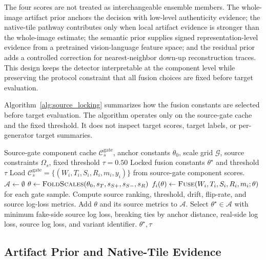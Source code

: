 \documentclass[lettersize,journal]{IEEEtran}
\begin{document}
The four scores are not treated as interchangeable ensemble members. The whole-image artifact prior anchors the decision with low-level authenticity evidence; the native-tile pathway contributes only when local artifact evidence is stronger than the whole-image estimate; the semantic prior supplies signed representation-level evidence from a pretrained vision-language feature space; and the residual prior adds a controlled correction for nearest-neighbor down-up reconstruction traces. This design keeps the detector interpretable at the component level while preserving the protocol constraint that all fusion choices are fixed before target evaluation.

Algorithm~\ref{alg:source_locking} summarizes how the fusion constants are selected before target evaluation. The algorithm operates only on the source-gate cache and the fixed threshold. It does not inspect target scores, target labels, or per-generator target summaries.

\begin{algorithm}[t]
\caption{Source-only fusion calibration}
\label{alg:source_locking}
\begin{algorithmic}[1]
\REQUIRE Source-gate component cache $\mathcal{C}_{s}^{\mathrm{gate}}$, anchor constants $\theta_0$, scale grid $\mathcal{G}$, source constraints $\Omega_s$, fixed threshold $\tau=0.50$
\ENSURE Locked fusion constants $\theta^\star$ and threshold $\tau$
\STATE Load $\mathcal{C}_{s}^{\mathrm{gate}}=\{(W_i,T_i,S_i,R_i,m_i,y_i)\}$ from source-gate component scores.
\STATE $\mathcal{A}\leftarrow\emptyset$
    \STATE $\theta\leftarrow\textsc{FoldScales}(\theta_0,s_T,s_{S+},s_{S-},s_R)$
    \STATE $f_i(\theta)\leftarrow\textsc{Fuse}(W_i,T_i,S_i,R_i,m_i;\theta)$ for each gate sample.
    \STATE Compute source ranking, threshold, drift, flip-rate, and source log-loss metrics.
        \STATE Add $\theta$ and its source metrics to $\mathcal{A}$.
    \ENDIF
\ENDFOR
\STATE Select $\theta^\star\in\mathcal{A}$ with minimum fake-side source log loss, breaking ties by anchor distance, real-side log loss, source log loss, and variant identifier.
\RETURN $\theta^\star,\tau$
\end{algorithmic}
\end{algorithm}

\subsection{Artifact Prior and Native-Tile Evidence}
\label{sec:method_artifact}
\end{document}
